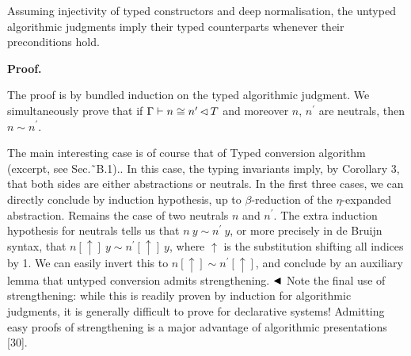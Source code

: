 \documentclass[10pt,a4paper]{amsart}
\begin{document}
 
Assuming injectivity of typed constructors and deep normalisation, the untyped algorithmic judgments imply their typed counterparts whenever their preconditions hold.\par
 
 

 
\par\medskip\noindent\textbf{Proof.}\par
 
 
The proof is by bundled induction on the typed algorithmic judgment. We simultaneously prove that if $\Gamma\vdash n\mathrel{\raisebox{-0.5pt}{$\cong$}}n^{\prime}\operatorname{%
\mathrel{\lhd}}T$ and moreover $n$, $n^{\prime}$ are neutrals, then $n\sim n^{\prime}$.\par
 
 
 
The main interesting case is of course that of   Typed conversion algorithm (excerpt, see Sec.˜B.1).. In this case, the typing invariants imply, by Corollary 3, that both sides are either abstractions or neutrals. In the first three cases, we can directly conclude by induction hypothesis, up to $\beta$-reduction of the $\eta$-expanded abstraction. Remains the case of two neutrals $n$ and $n^{\prime}$. The extra induction hypothesis for neutrals tells us that $n\ y\sim n^{\prime}\ y$, or more precisely in de Bruijn syntax, that $n\mathord{\left[\uparrow\right]}\ y\sim n^{\prime}\mathord{\left[\uparrow%
\right]}\ y$, where $\uparrow$ is the substitution shifting all indices by 1. We can easily invert this to $n\mathord{\left[\uparrow\right]}\sim n^{\prime}\mathord{\left[\uparrow\right]}$, and conclude by an auxiliary lemma that untyped conversion admits strengthening. $\hfill\blacktriangleleft$ Note the final use of strengthening: while this is readily proven by induction for algorithmic judgments, it is generally difficult to prove for declarative systems! Admitting easy proofs of strengthening is a major advantage of algorithmic presentations [30].\par
 
 
 
\end{document}
